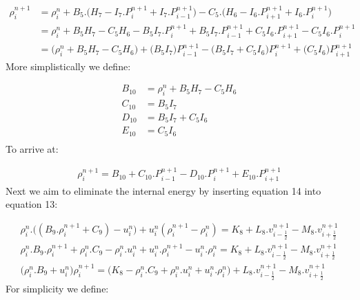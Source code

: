 \documentclass[11pt,letterpaper,titlepage]{article}
\newcommand{\half}{\frac{1}{2}}
\begin{document}
\begin{equation*}
\begin{aligned}
\rho_i^{n+1}&=\rho_i^{n}+B_5.\biggr( H_7-I_7.P_{i}^{n+1}+I_7.P_{i-1}^{n+1} \biggr)- C_5.\biggr(H_6-I_6.P_{i+1}^{n+1}+I_6.P_{i}^{n+1} \biggr) \\
&=\rho_i^n + B_5 H_7 - C_5 H_6 - B_5 I_7 . P_{i}^{n+1} + B_5 I_7 . P_{i-1}^{n+1} + C_5 I_6.P_{i+1}^{n+1} - C_5 I_6.P_{i}^{n+1} \\
&=\biggr( \rho_i^n + B_5 H_7 - C_5 H_6  \biggr) + \biggr( B_5 I_7 \biggr) P_{i-1}^{n+1} - \biggr(B_5 I_7 + C_5 I_6    \biggr) P_{i}^{n+1}+ \biggr(  C_5 I_6  \biggr) P_{i+1}^{n+1}
\end{aligned}
\end{equation*}
\newline
More simplistically we define:

\begin{equation*}
\begin{aligned}
B_{10} &=  \rho_i^n + B_5 H_7 - C_5 H_6 \\
C_{10} &=   B_5 I_7 \\
D_{10} &=  B_5 I_7 + C_5 I_6  \\
E_{10} &=  C_5 I_6 \\
\end{aligned}
\end{equation*}
\newline
To arrive at:

\begin{equation}
\begin{aligned}
\rho_i^{n+1}=B_{10} + C_{10}. P_{i-1}^{n+1} - D_{10}. P_{i}^{n+1}+ E_{10}. P_{i+1}^{n+1}
\end{aligned}
\end{equation}
\newline
Next we aim to eliminate the internal energy by inserting equation 14 into equation 13:

\begin{equation*}
\begin{aligned}
\rho_i^{n}.\biggr((B_9.\rho_{i}^{n+1}+C_9)-u_i^{n} \biggr) + u_i^{n}(\rho_i^{n+1}-\rho_i^{n})=K_8+L_8.v_{i-\half}^{n+1}-M_8.v_{i+\half}^{n+1} \\
\rho_i^{n}.B_9.\rho_{i}^{n+1}+\rho_i^{n}.C_9-\rho_i^{n}.u_i^n +u_i^n.\rho_{i}^{n+1} - u_i^n.\rho_{i}^{n}=K_8+L_8.v_{i-\half}^{n+1}-M_8.v_{i+\half}^{n+1} \\
\biggr(\rho_i^{n}.B_9+u_i^n\biggr)\rho_{i}^{n+1} = \biggr( K_8 -\rho_i^{n}.C_9+\rho_i^{n}.u_i^n +u_i^n.\rho_{i}^{n} \biggr)+L_8.v_{i-\half}^{n+1}-M_8.v_{i+\half}^{n+1}
\end{aligned}
\end{equation*}
\newline
For simplicity we define:
\end{document}
